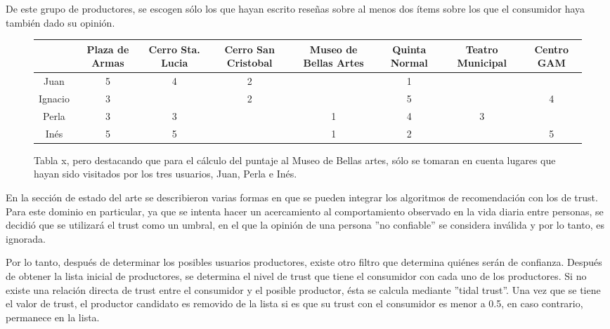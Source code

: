 De este grupo de productores, se escogen sólo los que hayan escrito reseñas sobre al menos dos ítems sobre los que el consumidor haya también dado su opinión.
\begin{figure}
\centering
\begin{adjustbox}{max width=\textwidth}
\begin{tabular}{|c|g|g|c|c|g|c|c|}

                  & Plaza de Armas & Cerro Sta. Lucia & Cerro San Cristobal & Museo de Bellas Artes & Quinta Normal  & Teatro Municipal & Centro GAM \\
\hline

Juan          & 5 & 4 & 2 &   & 1 &   &   \\

Ignacio       & 3 &   & 2 &   & 5 &   & 4 \\

Perla         & 3 & 3 &   & 1 & 4 & 3 &   \\

Inés          & 5 & 5 &   & 1 & 2 &   & 5 \\


\end{tabular}
\end{adjustbox}
\caption{Tabla x, pero destacando que para el cálculo del puntaje al Museo de Bellas artes, sólo se tomaran en cuenta lugares que hayan sido visitados por los tres usuarios, Juan, Perla e Inés.}

\end{figure}


En la sección de estado del arte se describieron varias formas en que se pueden integrar los algoritmos de recomendación con los de trust. Para este dominio en particular, ya que se intenta hacer un acercamiento al comportamiento observado en la vida diaria entre personas, se decidió que se utilizará el trust como un umbral, en el que la opinión de una persona ''no confiable'' se considera inválida y por lo tanto, es ignorada. 

Por lo tanto, después de determinar los posibles usuarios productores, existe otro filtro que determina quiénes serán de confianza. Después de obtener la lista inicial de productores, se determina el nivel de trust que tiene el consumidor con cada uno de los productores. Si no existe una relación directa de trust entre el consumidor y el posible productor, ésta se calcula mediante ''tidal trust''. Una vez que se tiene el valor de trust, el productor candidato es removido de la lista si es que su trust con el consumidor es menor a 0.5, en caso contrario, permanece en la lista. 

